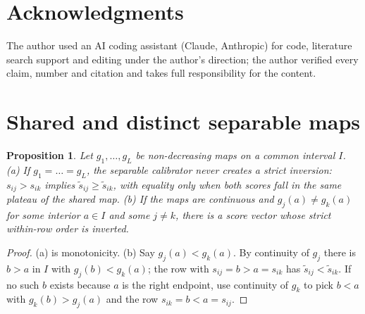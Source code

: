 \documentclass[sigconf,nonacm]{acmart}
\newtheorem{proposition}{Proposition}
\begin{document}
\section*{Acknowledgments}
The author used an AI coding assistant (Claude, Anthropic) for code, literature search support and editing under the author's direction; the author verified every claim, number and citation and takes full responsibility for the content.




\appendix
{}
\raggedbottom
\section{Shared and distinct separable maps}
\label{app:proof}
\begin{proposition}
\label{prop:sep}
Let $g_1,\dots,g_L$ be non-decreasing maps on a common interval $I$. (a) If $g_1=\dots=g_L$, the separable calibrator never creates a strict inversion: $s_{ij}>s_{ik}$ implies $\tilde s_{ij}\ge\tilde s_{ik}$, with equality only when both scores fall in the same plateau of the shared map. (b) If the maps are continuous and $g_j(a)\neq g_k(a)$ for some interior $a\in I$ and some $j\neq k$, there is a score vector whose strict within-row order is inverted.
\end{proposition}
\begin{proof}
(a) is monotonicity. (b) Say $g_j(a)<g_k(a)$. By continuity of $g_j$ there is $b>a$ in $I$ with $g_j(b)<g_k(a)$; the row with $s_{ij}=b>a=s_{ik}$ has $\tilde s_{ij}<\tilde s_{ik}$. If no such $b$ exists because $a$ is the right endpoint, use continuity of $g_k$ to pick $b<a$ with $g_k(b)>g_j(a)$ and the row $s_{ik}=b<a=s_{ij}$.
\end{proof}
\end{document}
